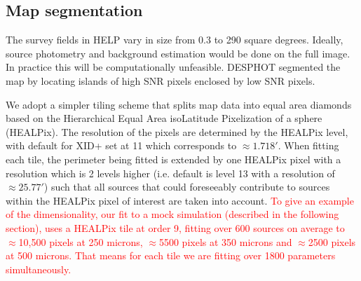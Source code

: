 \documentclass[useAMS,usenatbib]{mnras}
\begin{document}
\subsection{Map segmentation}
The survey fields in HELP vary in size from 0.3 to 290 square degrees. Ideally, source photometry and background estimation would be done on the full image. In practice this will be computationally unfeasible. \textsc{DESPHOT} segmented the map by locating islands of high SNR pixels enclosed by low SNR pixels.

%
%
We adopt a simpler tiling scheme that splits map data into equal area diamonds based on the Hierarchical Equal Area isoLatitude Pixelization of a sphere (HEALPix). The resolution of the pixels are determined by the HEALPix level, with default for \textsc{XID+} set at 11 which corresponds to $\approx 1.718'$. When fitting each tile, the perimeter being fitted is extended by one HEALPix pixel with a resolution which is 2 levels higher (i.e. default is level 13 with a resolution of $\approx 25.77'$) such that all sources that could foreseeably contribute to sources within the HEALPix pixel of interest are taken into account. \textcolor{red}{To give an example of the dimensionality, our fit to a mock simulation (described in the following section),  uses a HEALPix tile at order 9, fitting over 600 sources on average to  $\approx$10,500 pixels at 250 microns, $\approx$5500 pixels at 350 microns and $\approx$2500 pixels at 500 microns. That means for each tile we are fitting over 1800 parameters simultaneously.}
\end{document}
